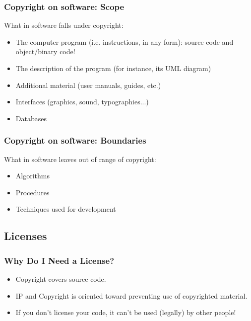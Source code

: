 \documentclass{beamer}
\begin{document}
\begin{frame}
\frametitle{Copyright on software: Scope}

What in software falls under copyright:

\begin{itemize}
\item The computer program (i.e. instructions, in any form): 
      \alert{source code} and \alert{object/binary code}!
\item The description of the program (for instance, its UML diagram)
\item Additional material (user manuals, guides, etc.)
\item Interfaces (graphics, sound, typographies...)
\item Databases
\end{itemize}

\end{frame}


\begin{frame}
\frametitle{Copyright on software: Boundaries}

What in software leaves out of range of copyright:

\begin{itemize}
\item Algorithms 
\item Procedures 
\item Techniques used for development 
\end{itemize}

\end{frame}


\subsection{Licenses}

\begin{frame}
\frametitle{Why Do I Need a License?}

\begin{itemize}
\item Copyright covers source code.
\item IP and Copyright is oriented toward preventing use of copyrighted material.
\item If you don't license your code, \alert{it can't be used (legally) by other people}!
\end{itemize}

\end{frame}
\end{document}
